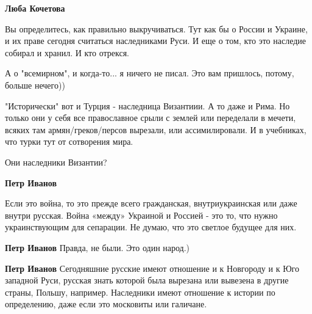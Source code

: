 \begin{itemize}
\begin{itemize}
 
\textbf{Люба Кочетова} 

Вы определитесь, как правильно выкручиваться. Тут как бы о России и Украине, и
их праве сегодня считаться наследниками Руси. И еще о том, кто это наследие
собирал и хранил. И кто отрекся.

А о "всемирном", и когда-то... я ничего не писал. Это вам пришлось, потому,
больше нечего))

"Исторически" вот и Турция - наследница Византиии. А то даже и Рима. Но только
они у себя все православное срыли с землей или переделали в мечети, всяких там
армян/греков/персов вырезали, или ассимилировали. И в учебниках, что турки тут
от сотворения мира.

Они наследники Византии?


 
\textbf{Петр Иванов} 

Если это война, то это прежде всего гражданская, внутриукраинская или даже
внутри русская. Война «между» Украиной и Россией - это то, что нужно
украинствующим для сепарации. Не думаю, что это светлое будущее для них.

 
\textbf{Петр Иванов} Правда, не были. Это один народ.)

 
\textbf{Петр Иванов} Сегодняшние русские имеют отношение и к Новгороду и к Юго западной Руси, русская знать которой была вырезана или вывезена в другие страны, Польшу, например. Наследники имеют отношение к истории по определению, даже если это московиты или галичане.


\end{itemize}
\end{itemize}
